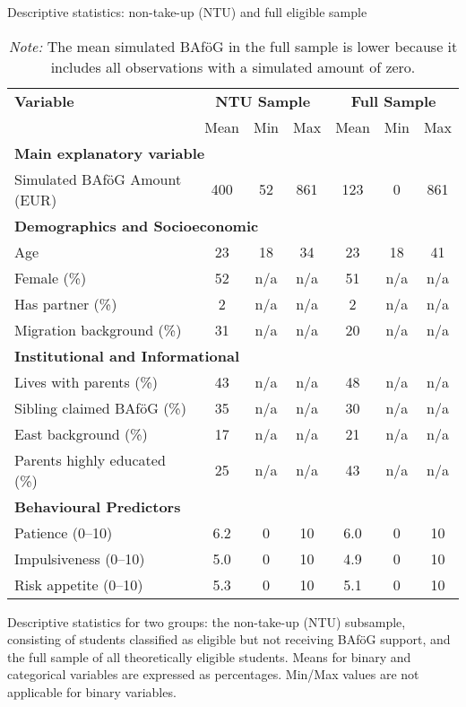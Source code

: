 \begin{table}[H]
\footnotesize
\caption*{Descriptive statistics: non-take-up (NTU) and full eligible sample}
\centering
\begin{tabular}{p{8cm}ccc|ccc}
\toprule
\textbf{Variable} & \multicolumn{3}{c|}{\textbf{NTU Sample}} & \multicolumn{3}{c}{\textbf{Full Sample}} \\
& Mean & Min & Max & Mean & Min & Max \\
\midrule
\multicolumn{7}{l}{\textbf{Main explanatory variable}} \\
Simulated BAföG Amount (EUR)       & 400    & 52    & 861   & 123    & 0    & 861   \\
\midrule
\multicolumn{6}{l}{\textbf{Demographics and Socioeconomic}} \\
Age                         & 23     & 18    & 34    & 23     & 18   & 41    \\
Female (\%)                 & 52     & n/a   & n/a   & 51     & n/a  & n/a   \\
Has partner (\%)            & 2      & n/a   & n/a   & 2      & n/a  & n/a   \\
Migration background (\%)   & 31     & n/a   & n/a   & 20     & n/a  & n/a   \\
\midrule
\multicolumn{6}{l}{\textbf{Institutional and Informational}} \\
Lives with parents (\%)          & 43     & n/a   & n/a   & 48     & n/a  & n/a   \\
Sibling claimed BAföG (\%)  & 35     & n/a   & n/a   & 30     & n/a  & n/a   \\
East background (\%)        & 17     & n/a   & n/a   & 21     & n/a  & n/a   \\
Parents highly educated (\%)& 25     & n/a   & n/a   & 43     & n/a  & n/a   \\
\midrule
\multicolumn{6}{l}{\textbf{Behavioural Predictors}} \\
Patience (0--10)            & 6.2    & 0     & 10    & 6.0    & 0    & 10    \\
Impulsiveness (0--10)       & 5.0    & 0     & 10    & 4.9    & 0    & 10    \\
Risk appetite (0--10)       & 5.3    & 0     & 10    & 5.1    & 0    & 10    \\
\bottomrule
\end{tabular}
\caption{\small{Descriptive statistics for two groups: the non-take-up (NTU) subsample, consisting of students classified as eligible but not receiving BAföG support, and the full sample of all theoretically eligible students. Means for binary and categorical variables are expressed as percentages. Min/Max values are not applicable for binary variables.}}
\caption*{\small{\textit{Note:}  The mean simulated BAföG in the full sample is lower because it includes all observations with a simulated amount of zero.}}
\label{tab:descriptive_ntu_all}
\end{table}
